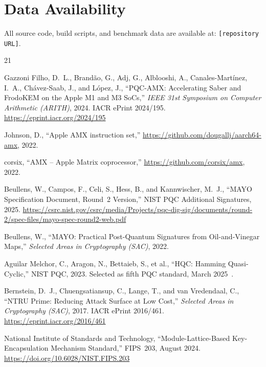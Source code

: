 \documentclass[utf8]{FrontiersinHarvard}
\begin{document}
\section*{Data Availability}

All source code, build scripts, and benchmark data are available at: \texttt{[repository URL]}.


\begin{thebibliography}{21}

Gazzoni Filho, D.~L., Brand\~{a}o, G., Adj, G., Alblooshi, A., Canales-Mart\'{i}nez, I.~A., Ch\'{a}vez-Saab, J., and L\'{o}pez, J.,
``PQC-AMX: Accelerating Saber and FrodoKEM on the Apple M1 and M3 SoCs,''
\emph{IEEE 31st Symposium on Computer Arithmetic (ARITH)}, 2024.
IACR ePrint 2024/195.
\url{https://eprint.iacr.org/2024/195}

Johnson, D.,
``Apple AMX instruction set,''
\url{https://github.com/dougallj/aarch64-amx}, 2022.

corsix,
``AMX -- Apple Matrix coprocessor,''
\url{https://github.com/corsix/amx}, 2022.

Beullens, W., Campos, F., Celi, S., Hess, B., and Kannwischer, M.~J.,
``MAYO Specification Document, Round~2 Version,''
NIST PQC Additional Signatures, 2025.
\url{https://csrc.nist.gov/csrc/media/Projects/pqc-dig-sig/documents/round-2/spec-files/mayo-spec-round2-web.pdf}

Beullens, W.,
``MAYO: Practical Post-Quantum Signatures from Oil-and-Vinegar Maps,''
\emph{Selected Areas in Cryptography (SAC)}, 2022.

Aguilar Melchor, C., Aragon, N., Bettaieb, S., et al.,
``HQC: Hamming Quasi-Cyclic,''
NIST PQC, 2023. Selected as fifth PQC standard, March 2025~\cite{nist2025hqc}.

Bernstein, D.~J., Chuengsatiansup, C., Lange, T., and van Vredendaal, C.,
``NTRU Prime: Reducing Attack Surface at Low Cost,''
\emph{Selected Areas in Cryptography (SAC)}, 2017.
IACR ePrint 2016/461.
\url{https://eprint.iacr.org/2016/461}

National Institute of Standards and Technology,
``Module-Lattice-Based Key-Encapsulation Mechanism Standard,''
FIPS~203, August 2024.
\url{https://doi.org/10.6028/NIST.FIPS.203}


\end{thebibliography}
\end{document}
